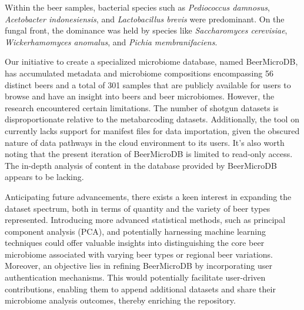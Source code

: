     Within the beer samples, bacterial species such as \textit{Pediococcus damnosus}, \textit{Acetobacter indonesiensis}, and \textit{Lactobacillus brevis} were predominant. On the fungal front, the dominance was held by species like \textit{Saccharomyces cerevisiae}, \textit{Wickerhamomyces anomalus}, and \textit{Pichia membranifaciens}.
    
    Our initiative to create a specialized microbiome database, named BeerMicroDB, has accumulated metadata and microbiome compositions encompassing 56 distinct beers and a total of 301 samples that are publicly available for users to browse and have an insight into beers and beer microbiomes. However, the research encountered certain limitations. The number of shotgun datasets is disproportionate relative to the metabarcoding datasets. Additionally, the  tool on  currently lacks support for manifest files for data importation, given the obscured nature of data pathways in the cloud environment to its users. It's also worth noting that the present iteration of BeerMicroDB is limited to read-only access. The in-depth analysis of content in the database provided by BeerMicroDB appears to be lacking.
    
    Anticipating future advancements, there exists a keen interest in expanding the dataset spectrum, both in terms of quantity and the variety of beer types represented. Introducing more advanced statistical methods, such as principal component analysis (PCA), and potentially harnessing machine learning techniques could offer valuable insights into distinguishing the core beer microbiome associated with varying beer types or regional beer variations. Moreover, an objective lies in refining BeerMicroDB by incorporating user authentication mechanisms. This would potentially facilitate user-driven contributions, enabling them to append additional datasets and share their microbiome analysis outcomes, thereby enriching the repository.